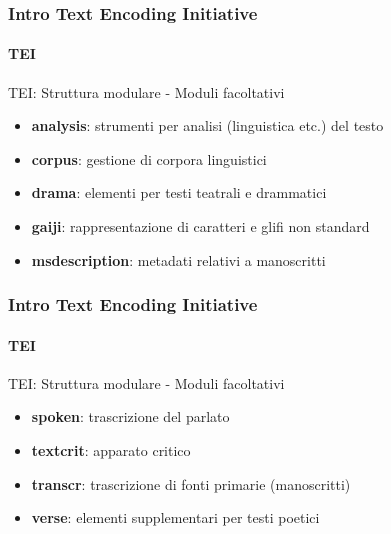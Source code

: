 \begin{frame}
	\frametitle{Intro Text Encoding Initiative}
	\framesubtitle{TEI}
	\addtocounter{nframe}{1}

	\begin{block}{TEI: Struttura modulare - Moduli facoltativi}
		\begin{itemize}
			\item \textbf{analysis}: strumenti per analisi (linguistica etc.) del testo
			\item \textbf{corpus}: gestione di corpora linguistici
			\item \textbf{drama}: elementi per testi teatrali e drammatici
			\item \textbf{gaiji}: rappresentazione di caratteri e glifi non standard
			\item \textbf{msdescription}: metadati relativi a manoscritti
		\end{itemize}

	\end{block}

\end{frame}


\begin{frame}
	\frametitle{Intro Text Encoding Initiative}
	\framesubtitle{TEI}
	\addtocounter{nframe}{1}

	\begin{block}{TEI: Struttura modulare - Moduli facoltativi}
		\begin{itemize}
			\item \textbf{spoken}: trascrizione del parlato
			\item \textbf{textcrit}: apparato critico
			\item \textbf{transcr}:  trascrizione di fonti primarie (manoscritti)
			\item \textbf{verse}: elementi supplementari per testi poetici
		\end{itemize}

	\end{block}

\end{frame}




